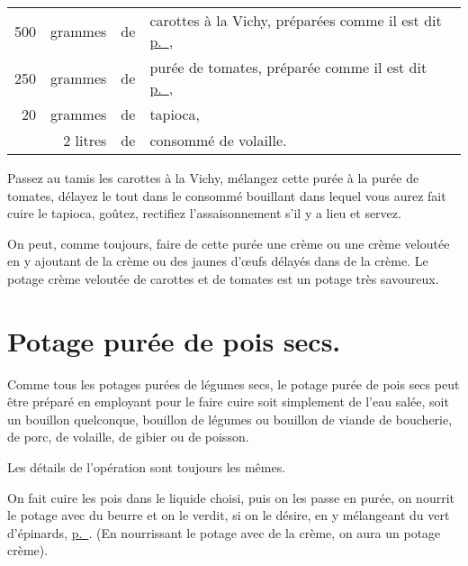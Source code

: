 \medskip

\footnotesize
\begin{longtable}{rrrp{16em}}                                                    
    500 & grammes  & de & carottes à la Vichy, préparées comme il est dit 
                          \hyperlink{p0770}{p. \pageref{pg0770}},                                         \\
    250 & grammes  & de & purée de tomates, préparée comme 
                          il est dit \hyperlink{p0768}{p. \pageref{pg0768}},                              \\
     20 & grammes  & de & tapioca,                                                                        \\
        & 2 litres & de & consommé de volaille.                                                           \\
\end{longtable}
\normalsize
                                                                             
Passez au tamis les carottes à la Vichy, mélangez cette purée à la purée de
tomates, délayez le tout dans le consommé bouillant dans lequel vous aurez fait
cuire le tapioca, goûtez, rectifiez l'assaisonnement s'il y a lieu et servez.

\sk

On peut, comme toujours, faire de cette purée une crème ou une crème veloutée
en y ajoutant de la crème ou des jaunes d'œufs délayés dans de la crème. Le
potage crème veloutée de carottes et de tomates est un potage très savoureux.

\section*{\centering Potage purée de pois secs.}

Comme tous les potages purées de légumes secs, le potage purée de pois secs
peut être préparé en employant pour le faire cuire soit simplement de l'eau
salée, soit un bouillon quelconque, bouillon de légumes ou bouillon de viande
de boucherie, de porc, de volaille, de gibier ou de poisson.

Les détails de l'opération sont toujours les mêmes.

On fait cuire les pois dans le liquide choisi, puis on les passe en purée, on
nourrit le potage avec du beurre et on le verdit, si on le désire, en
y mélangeant du vert d'épinards, \hyperlink{p0324}{p. \pageref{pg0324}}. (En
nourrissant le potage avec de la crème, on aura un potage crème).


